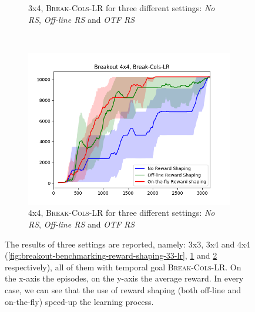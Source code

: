 \begin{figure}[h]
\begin{subfigure}[b]{0.57\textwidth}
	 	\caption{\Breakout 3x4, \textsc{Break-Cols-LR} for three different settings: \emph{No RS}, \emph{Off-line RS} and \emph{OTF RS}}
	 	\label{fig:breakout-benchmarking-reward-shaping-34-lr}
	 \end{subfigure}
	 ~ %
	 \begin{subfigure}[b]{0.57\textwidth}
	 	\includegraphics[width=\textwidth]{images/rs-comparison_b44.png}
	 	\caption{\Breakout 4x4, \textsc{Break-Cols-LR} for three different settings: \emph{No RS}, \emph{Off-line RS} and \emph{OTF RS}}
	 	\label{fig:breakout-benchmarking-reward-shaping-44-lr}
	 \end{subfigure}
	 \caption{The results of three settings are reported, namely: \Breakout 3x3, 3x4 and 4x4 (\ref{fig:breakout-benchmarking-reward-shaping-33-lr}, \ref{fig:breakout-benchmarking-reward-shaping-34-lr} and  \ref{fig:breakout-benchmarking-reward-shaping-44-lr} respectively), all of them with temporal goal \textsc{Break-Cols-LR}. On the x-axis the episodes, on the y-axis the average reward. In every case, we can see that the use of reward shaping (both off-line and on-the-fly) speed-up the learning process. }\label{fig:breakout-benchmarking-reward-shaping-lr-different-bricks}
\end{figure}


